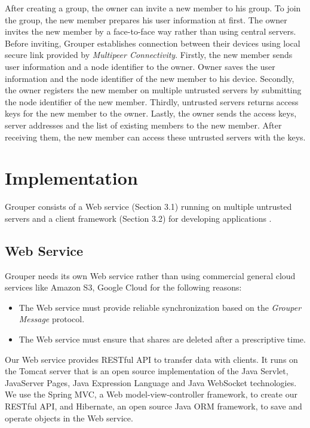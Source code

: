 \documentclass[twocolumn,10pt]{article}
\begin{document}
After creating a group, the owner can invite a new member to his group. 
To join the group, the new member prepares his user information at first. 
The owner invites the new member by a face-to-face way rather than using central servers. 
Before inviting, Grouper establishes connection between their devices using local secure link provided by \emph{Multipeer Connectivity}\cite{mc}. 
Firstly, the new member sends user information and a node identifier to the owner. 
Owner saves the user information and the node identifier of the new member to his device. 
Secondly, the owner registers the new member on multiple untrusted servers by submitting the node identifier of the new member. 
Thirdly, untrusted servers returns access keys for the new member to the owner. 
Lastly, the owner sends the access keys, server addresses and the list of existing members to the new member. 
After receiving them, the new member can access these untrusted servers with the keys.

\section{Implementation}

Grouper consists of a Web service (Section 3.1) running on multiple untrusted servers and a client framework (Section 3.2) for developing applications .

\subsection{Web Service}

Grouper needs its own Web service rather than using commercial general cloud services like Amazon S3, Google Cloud for the following reasons:

\begin{itemize}
	\setlength{\itemsep}{1pt}
	\setlength{\parskip}{0pt}
	\setlength{\parsep}{0pt}
	\item The Web service must provide reliable synchronization based on the \emph{Grouper Message} protocol.
	\item The Web service must ensure that shares are deleted after a prescriptive time.
\end{itemize}

Our Web service provides RESTful API to transfer data with clients. 
It runs on the Tomcat server that is an open source implementation of the Java Servlet, JavaServer Pages, Java Expression Language and Java WebSocket technologies. 
We use the Spring MVC, a  Web model-view-controller framework, to create our RESTful API, and Hibernate, an open source Java ORM framework, to save and operate objects in the Web service. 
\end{document}
